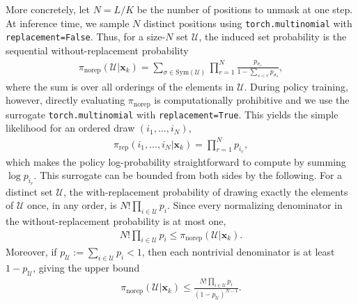 More concretely, let $N=L/K$ be the number of positions to unmask at one step. At inference time, we sample $N$ distinct positions using \texttt{torch.multinomial} with \texttt{replacement=False}. Thus, for a size-$N$ set $\mathcal U$, the induced set probability is the sequential without-replacement probability
\begin{align*}
    \pi_{\mathrm{norep}}(\mathcal U|\bm x_k)
    =
    \sum_{\sigma\in\mathrm{Sym}(\mathcal U)}
    \prod_{r=1}^{N}
    \frac{p_{\sigma_r}}{1-\sum_{s<r}p_{\sigma_s}},
\end{align*}
where the sum is over all orderings of the elements in $\mathcal U$. During policy training, however, directly evaluating $\pi_{\mathrm{norep}}$ is computationally prohibitive and we use the surrogate \texttt{torch.multinomial} with \texttt{replacement=True}. This yields the simple likelihood for an ordered draw $(i_1,\ldots,i_N)$,
\begin{align*}
    \pi_{\mathrm{rep}}(i_1,\ldots,i_N|\bm x_k)=\prod_{r=1}^{N}p_{i_r},
\end{align*}
which makes the policy log-probability straightforward to compute by summing $\log p_{i_r}$. This surrogate can be bounded from both sides by the following. For a distinct set $\mathcal U$, the with-replacement probability of drawing exactly the elements of $\mathcal U$ once, in any order, is $N!\prod_{i\in\mathcal U}p_i$. Since every normalizing denominator in the without-replacement probability is at most one,
\begin{align*}
    N!\prod_{i\in\mathcal U}p_i
    \leq
    \pi_{\mathrm{norep}}(\mathcal U|\bm x_k).
\end{align*}
Moreover, if $p_{\mathcal U}:=\sum_{i\in\mathcal U}p_i<1$, then each nontrivial denominator is at least $1-p_{\mathcal U}$, giving the upper bound
\begin{align*}
    \pi_{\mathrm{norep}}(\mathcal U|\bm x_k)
    \leq
    \frac{N!\prod_{i\in\mathcal U}p_i}{(1-p_{\mathcal U})^{N-1}}.
\end{align*}

\iffalse
